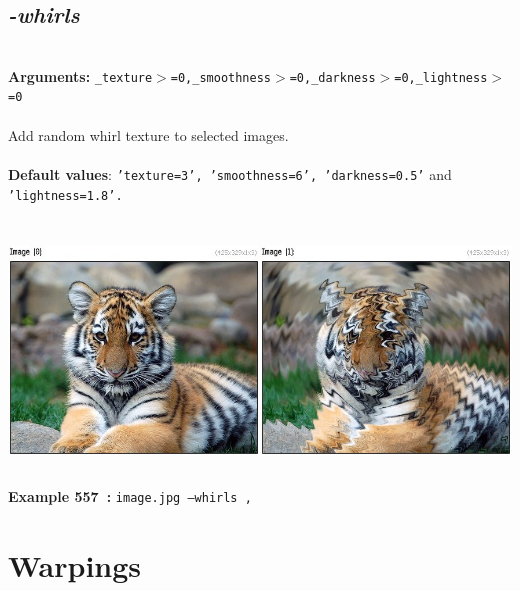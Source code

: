 \documentclass[a4paper,11pt,twoside]{book}
\begin{document}
\subsection{\emph{-whirls} }\vspace*{-0.5em}
~\\\textbf{Arguments: } 
{\small \texttt{\_texture$>$=0,\_smoothness$>$=0,\_darkness$>$=0,\_lightness$>$=0}}\\~\\
Add random whirl texture to selected images.
~\\~\\\textbf{Default values}: {\small \texttt{'texture=3', 'smoothness=6', 'darkness=0.5'} and \texttt{'lightness=1.8'.}}
\begin{center}\includegraphics[keepaspectratio=true,height=7cm,width=\textwidth]{img/gmic_def557.jpg}\\
{\footnotesize \textbf{Example 557~:} \texttt{image.jpg --whirls ,}}
\end{center}
\section{Warpings}
\end{document}
